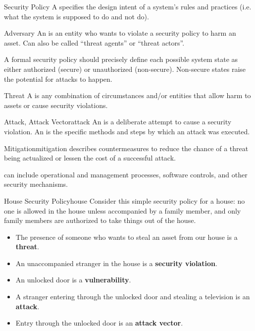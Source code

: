 \documentclass[12pt]{report}
\begin{document}
\begin{dfnbox}{Security Policy}{}
    A  specifies the design intent of a system's rules and practices (i.e. what the system is supposed to do and not do).
\end{dfnbox}

\begin{dfnbox}{Adversary}{}
    An  is an entity who wants to violate a security policy to harm an asset. Can also be called ``threat agents'' or ``threat actors''.
\end{dfnbox}

A formal security policy should precisely define each possible system state as either authorized (secure) or unauthorized (non-secure). Non-secure states raise the potential for attacks to happen.

\begin{dfnbox}{Threat}{}
    A  is any combination of circumstances and/or entities that allow harm to assets or cause security violations.
\end{dfnbox}

\begin{dfnbox}{Attack, Attack Vector}{attack}
    An  is a deliberate attempt to cause a security violation. An  is the specific methods and steps by which an attack was executed.

\end{dfnbox}

\begin{dfnbox}{Mitigation}{mitigation}
     describes countermeasures to reduce the chance of a threat being actualized or lessen the cost of a successful attack.
\end{dfnbox}

 can include operational and management processes, software controls, and other security mechanisms.

\begin{exbox}{House Security Policy}{house}
    Consider this simple security policy for a house: no one is allowed in the house unless accompanied by a family member, and only family members are authorized to take things out of the house.
    \begin{itemize}[noitemsep]
        \item The presence of someone who wants to steal an asset from our house is a \textbf{threat}.
        \item An unaccompanied stranger in the house is a \textbf{security violation}.
        \item An unlocked door is a \textbf{vulnerability}.
        \item A stranger entering through the unlocked door and stealing a television is an \textbf{attack}.
        \item Entry through the unlocked door is an \textbf{attack vector}.
    \end{itemize}
\end{exbox}
\end{document}
